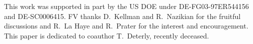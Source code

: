 \documentclass[aps,pra,twocolumn]{revtex4}
\begin{document}


\begin{acknowledgments}
This work was supported in part by the US DOE under 
DE-FG03-97ER544156 and DE-SC0006415. 
FV thanks D.\ Kellman and R.\ Nazikian for the fruitful discussions and 
R.\ La Haye and R.\ Prater for the interest and encouragement. 
This paper is dedicated to coauthor T.\ Deterly, recently 
deceased. 
\end{acknowledgments}
\end{document}
